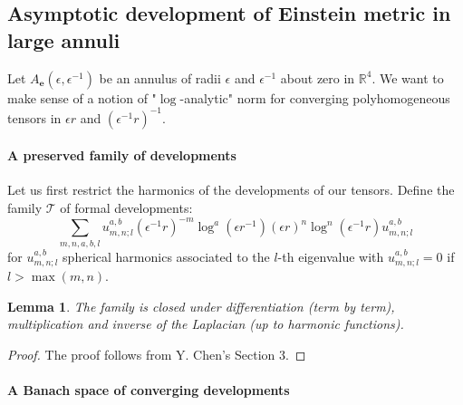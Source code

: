\documentclass[12pt]{article}
\newtheorem{lem}[thm]{Lemma}
\begin{document}
  
    
    \subsection{Asymptotic development of Einstein metric in large annuli}
    Let $A_\mathbf{e}(\epsilon,\epsilon^{-1})$ be an annulus of radii $\epsilon$ and $\epsilon^{-1}$ about zero in $\mathbb{R}^4$. We want to make sense of a notion of "$\log$-analytic" norm for converging polyhomogeneous tensors in $\epsilon r$ and $(\epsilon^{-1}r)^{-1}$.
    
    \paragraph{A preserved family of developments}
    
    Let us first restrict the harmonics of the developments of our tensors. Define the family $ \mathcal{T} $ of formal developments:
    $$\sum_{m,n,a,b,l} u_{m,n;l}^{a,b}(\epsilon^{-1} r)^{-m}\log^a(\epsilon r^{-1})(\epsilon r)^n\log^n(\epsilon^{-1} r) u_{m,n;l}^{a,b}$$
    for $u_{m,n;l}^{a,b}$ spherical harmonics associated to the $l$-th eigenvalue with $u_{m,n;l}^{a,b} = 0$ if $l>\max(m,n)$.
    
    \begin{lem}
       The family is closed under differentiation (term by term), multiplication and inverse of the Laplacian (up to harmonic functions).
    \end{lem}
    \begin{proof}
       The proof follows from Y. Chen's Section 3.
    \end{proof}
       
       
    \paragraph{A Banach space of converging developments}
       
\end{document}
